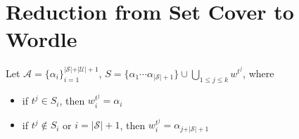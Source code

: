 \documentclass[10pt,a4paper]{article}
\begin{document}
\section{Reduction from Set Cover to Wordle}
Let $\mathcal{A}=\{\alpha_{i}\}^{\vert\mathcal{S}\vert+\vert \mathcal{U}\vert+1}_{i=1}$, $S= \{\alpha_1\cdots\alpha_{\vert\mathcal{S}\vert+1}\} \cup \bigcup_{1\leq j\leq k} w^{t^j}$, where 
\begin{itemize}
\item if $t^j\in S_i$, then $w^{t^j}_i = \alpha_i$ 
\item if $t^j\not  \in S_i $ or $i=\vert\mathcal{S}\vert+1$, then $w^{t^j}_i=\alpha_{j+\vert\mathcal{S}\vert+1}$ 
\end{itemize}
\end{document}
